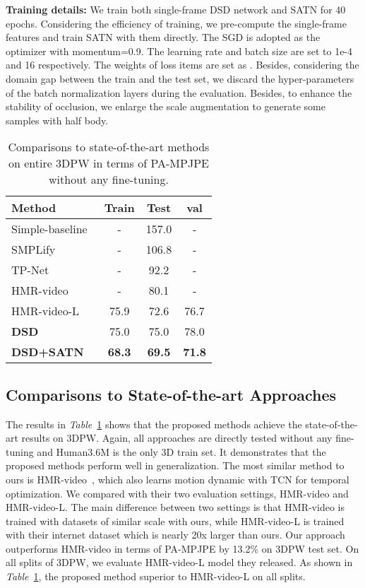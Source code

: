 \documentclass[10pt,twocolumn,letterpaper]{article}
\begin{document}
\textbf{Training details:} We train both single-frame DSD network and SATN for 40 epochs. Considering the efficiency of training, we pre-compute the single-frame features and train SATN with them directly. The SGD is adopted as the optimizer with momentum=0.9. The learning rate and batch size are set to 1e-4 and 16 respectively. The weights of loss items are set as . Besides, considering the domain gap between the train and the test set, we discard the hyper-parameters of the batch normalization layers during the evaluation. Besides, to enhance the stability of occlusion, we enlarge the scale augmentation to generate some samples with half body.


\begin{table}
  \begin{center}
  \begin{tabular}{lccc}
  \hline
Method & Train & Test & val\\ \hline
  Simple-baseline~\cite{simple} & - & 157.0 & -\\SMPLify~\cite{keep} & - & 106.8 & -\\TP-Net~\cite{tpnet} & -  & 92.2 & -\\HMR-video~\cite{kanazawa2018learning} & - & 80.1 & -\\HMR-video-L~\cite{kanazawa2018learning} & 75.9 & 72.6 & 76.7\\
  \textbf{DSD} & 75.0  & 75.0 & 78.0\\\textbf{DSD+SATN} & \textbf{68.3} & \textbf{69.5} & \textbf{71.8}\\\hline
  \end{tabular}
  \end{center}
  \caption{Comparisons to state-of-the-art methods on entire 3DPW in terms of PA-MPJPE without any fine-tuning.}
  \label{tab:comp3dpw}
\end{table}

\subsection{Comparisons to State-of-the-art Approaches}
The results in \textit{Table}~\ref{tab:comp3dpw} shows that the proposed methods achieve the state-of-the-art results on 3DPW. Again, all approaches are directly tested without any fine-tuning and Human3.6M is the only 3D train set. It demonstrates that the proposed methods perform well in generalization. The most similar method to ours is HMR-video~\cite{kanazawa2018learning}, which also learns motion dynamic with TCN for temporal optimization. We compared with their two evaluation settings, HMR-video and HMR-video-L. The main difference between two settings is that HMR-video is trained with datasets of similar scale with ours, while HMR-video-L is trained with their internet dataset which is nearly 20x larger than ours. Our approach outperforms HMR-video in terms of PA-MPJPE by 13.2\% on 3DPW test set. On all splits of 3DPW, we evaluate HMR-video-L model they released. As shown in \textit{Table}~\ref{tab:comp3dpw}, the proposed method superior to HMR-video-L on all splits. 
\end{document}

